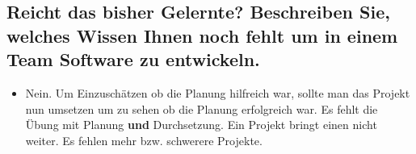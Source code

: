 \documentclass{scrartcl}
\begin{document}
\subsection*{Reicht das bisher Gelernte? Beschreiben Sie, welches Wissen Ihnen
	noch fehlt um in einem Team Software zu entwickeln.}
\begin{itemize}
	\item[] Nein. Um Einzuschätzen ob die Planung hilfreich war, sollte man das
		Projekt nun umsetzen um zu sehen ob die Planung erfolgreich war. Es
		fehlt die Übung mit Planung \textbf{und} Durchsetzung. Ein Projekt
		bringt einen nicht weiter. Es fehlen mehr bzw. schwerere Projekte.
\end{itemize}
\end{document}

